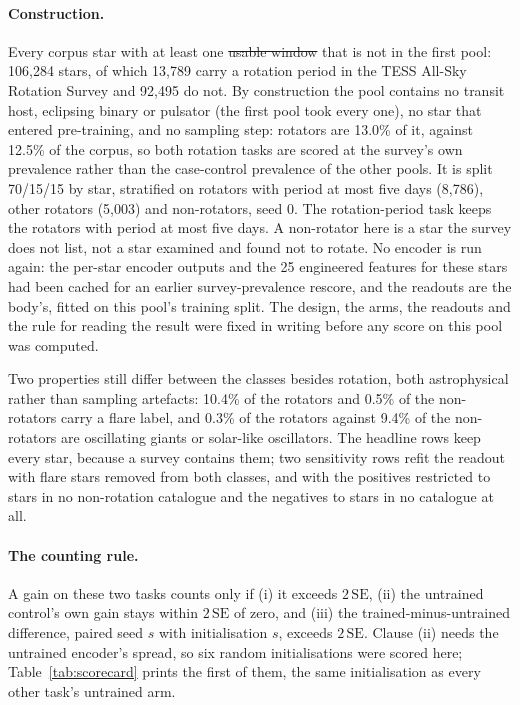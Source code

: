 \documentclass{article}
\makeatletter
\providecommand{\DIFaddtex}[1]{{\protect\color{blue}\uwave{#1}}} %
\providecommand{\DIFdeltex}[1]{{\protect\color{red}\sout{#1}}} %
\providecommand{\DIFaddbegin}{} %
\providecommand{\DIFaddend}{} %
\providecommand{\DIFdelbegin}{} %
\providecommand{\DIFdelend}{} %
\providecommand{\DIFadd}[1]{\texorpdfstring{\DIFaddtex{#1}}{#1}} %
\providecommand{\DIFdel}[1]{\texorpdfstring{\DIFdeltex{#1}}{}} %
\providecommand{\DIFscaledelfig}{0.5}
\newlength{\DIFdelgraphicswidth} %
\newlength{\DIFdelgraphicsheight} %
\providecommand{\DIFaddincludegraphics}[2][]{{\color{blue}\fbox{\DIFOincludegraphics[#1]{#2}}}} %
\providecommand{\DIFdelincludegraphics}[2][]{%
\sbox{\DIFdelgraphicsbox}{\DIFOincludegraphics[#1]{#2}}%
\settoboxwidth{\DIFdelgraphicswidth}{\DIFdelgraphicsbox} %
\settoboxtotalheight{\DIFdelgraphicsheight}{\DIFdelgraphicsbox} %
\scalebox{\DIFscaledelfig}{%
\parbox[b]{\DIFdelgraphicswidth}{\usebox{\DIFdelgraphicsbox}\\[-\baselineskip] \rule{\DIFdelgraphicswidth}{0em}}\llap{\resizebox{\DIFdelgraphicswidth}{\DIFdelgraphicsheight}{%
\setlength{\unitlength}{\DIFdelgraphicswidth}%
\begin{picture}(1,1)%
\thicklines\linethickness{2pt} %
{\color[rgb]{1,0,0}\put(0,0){\framebox(1,1){}}}%
{\color[rgb]{1,0,0}\put(0,0){\line( 1,1){1}}}%
{\color[rgb]{1,0,0}\put(0,1){\line(1,-1){1}}}%
\end{picture}%
}\hspace*{3pt}}} %
} %
\DeclareRobustCommand{\DIFaddbegin}{\DIFOaddbegin \let\includegraphics\DIFaddincludegraphics} %
\DeclareRobustCommand{\DIFaddend}{\DIFOaddend \let\includegraphics\DIFOincludegraphics} %
\DeclareRobustCommand{\DIFdelbegin}{\DIFOdelbegin \let\includegraphics\DIFdelincludegraphics} %
\DeclareRobustCommand{\DIFdelend}{\DIFOaddend \let\includegraphics\DIFOincludegraphics} %
\let\sout@orig\sout %
\renewcommand{\sout}[1]{\ifmmode\text{\sout@orig{\ensuremath{#1}}}\else\sout@orig{#1}\fi} %
\makeatother
\begin{document}
\paragraph{Construction.} Every corpus star with at least one \DIFdelbegin \DIFdel{usable window }\DIFdelend \DIFaddbegin \DIFadd{stored segment }\DIFaddend that is not in the
first pool: 106{,}284 stars, of which 13{,}789 carry a rotation period in the TESS All-Sky Rotation
Survey \citep{boyle2026} and 92{,}495 do not. By construction the pool contains no transit host,
eclipsing binary or pulsator (the first pool took every one), no star that entered pre-training, and
no sampling step: rotators are 13.0\% of it, against 12.5\% of the corpus, so both rotation tasks are
scored at the survey's own prevalence rather than the case-control prevalence of the other pools. It
is split 70/15/15 by star, stratified on rotators with period at most five days (8{,}786), other
rotators (5{,}003) and non-rotators, seed 0. The rotation-period task keeps the rotators with period
at most five days. A non-rotator here is a star the survey does not list, not a star examined and
found not to rotate. No encoder is run again: the per-star encoder outputs and the 25 engineered
features for these stars had been cached for an earlier survey-prevalence rescore, and the readouts
are the body's, fitted on this pool's training split. The design, the arms, the readouts and the rule
for reading the result were fixed in writing before any score on this pool was computed.

Two properties still differ between the classes besides rotation, both astrophysical rather than
sampling artefacts: 10.4\% of the rotators and 0.5\% of the non-rotators carry a flare label, and
0.3\% of the rotators against 9.4\% of the non-rotators are oscillating giants or solar-like
oscillators. The headline rows keep every star, because a survey contains them; two sensitivity rows
refit the readout with flare stars removed from both classes, and with the positives restricted to
stars in no non-rotation catalogue and the negatives to stars in no catalogue at all.

\paragraph{The counting rule.} A gain on these two tasks counts only if (i) it exceeds
$2\,\mathrm{SE}$, (ii) the untrained control's own gain stays within $2\,\mathrm{SE}$ of zero, and
(iii) the trained-minus-untrained difference, paired seed $s$ with initialisation $s$, exceeds
$2\,\mathrm{SE}$. Clause (ii) needs the untrained encoder's spread, so six random initialisations
were scored here; Table~\ref{tab:scorecard} prints the first of them, the same initialisation as
every other task's untrained arm.
\end{document}
